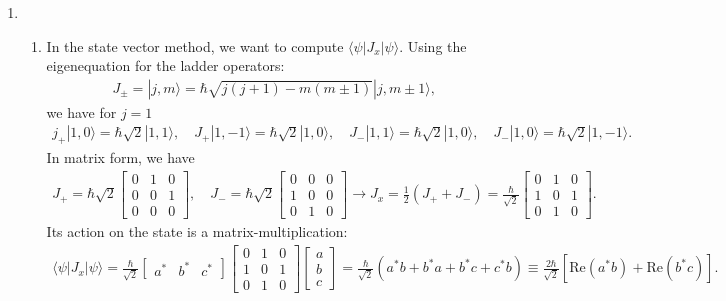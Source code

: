 \documentclass[letterpaper,11pt,twoside]{article}
\newcommand{\ket}[1]{|#1\rangle}
\newcommand{\braket}[1]{\langle#1\rangle}
\newcommand{\re}[1]{\text{Re}\left(#1\right)}
\begin{document}
\begin{enumerate}[itemsep=0pt,topsep=0pt,label=\alph*)]
  \item 
\begin{enumerate}[itemsep=0pt,topsep=0pt,label=\roman*)]
  \item In the state vector method, we want to compute $\braket{\psi|J_x|\psi}$. Using the eigenequation for the ladder operators:
  \begin{align*}
    J_\pm=\ket{j,m}=\hbar\sqrt{j(j+1)-m(m\pm1)}\ket{j,m\pm1},
  \end{align*}
  we have for $j=1$
  \begin{align*}
    j_+\ket{1,0}=\hbar\sqrt{2}\ket{1,1},\quad J_+\ket{1,-1}=\hbar\sqrt{2}\ket{1,0},\quad J_-\ket{1,1}=\hbar\sqrt{2}\ket{1,0},\quad J_-\ket{1,0}=\hbar\sqrt{2}\ket{1,-1}.
  \end{align*}
  In matrix form, we have 
  \begin{align*}
    J_+=\hbar\sqrt{2}\begin{bmatrix}
      0&1&0\\0&0&1\\0&0&0
    \end{bmatrix},\quad J_-=\hbar\sqrt{2}\begin{bmatrix}
      0&0&0\\1&0&0\\0&1&0
    \end{bmatrix}\longrightarrow J_x=\frac{1}{2}(J_++J_-)=\frac{\hbar}{\sqrt{2}}\begin{bmatrix}
      0&1&0\\1&0&1\\0&1&0
    \end{bmatrix}.
  \end{align*}
  Its action on the state is a matrix-multiplication:
  \begin{align*}
    \braket{\psi|J_x|\psi}=\frac{\hbar}{\sqrt{2}}\begin{bmatrix}
      a^*&b^*&c^*
    \end{bmatrix}\begin{bmatrix}
      0&1&0\\1&0&1\\0&1&0
    \end{bmatrix}\begin{bmatrix}
      a\\b\\c
    \end{bmatrix}=\frac{\hbar}{\sqrt{2}}(a^*b+b^*a+b^*c+c^*b)\equiv\frac{2\hbar}{\sqrt{2}}[\re{a^*b}+\re{b^*c}].

\end{align*}
\end{enumerate}
\end{enumerate}
\end{document}
